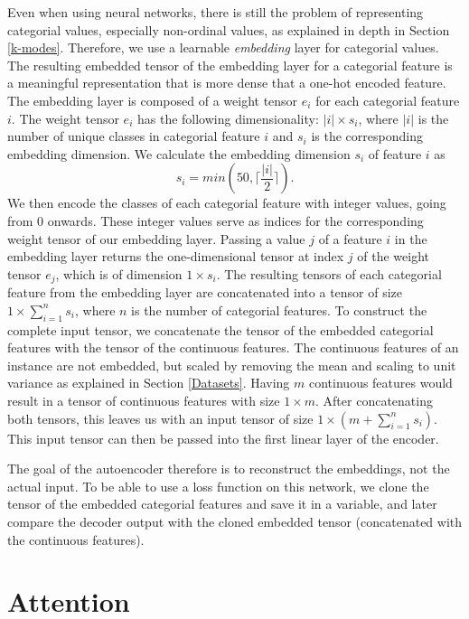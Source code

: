 Even when using neural networks, there is still the problem of representing categorial values, especially non-ordinal values, as explained in depth in Section \ref{k-modes}. Therefore, we use a learnable \textit{embedding} layer for categorial values. The resulting embedded tensor of the embedding layer for a categorial feature is a meaningful representation that is more dense that a one-hot encoded feature. The embedding layer is composed of a weight tensor $e_i$ for each categorial feature $i$. The weight tensor $e_i$  has the following dimensionality: $|i| \times s_i$, where $|i|$ is the number of unique classes in categorial feature $i$ and $s_i$ is the corresponding embedding dimension. We calculate the embedding dimension $s_i$ of feature $i$ as
$$s_i = min(50, \lceil \frac{|i|}{2} \rceil).$$
We then encode the classes of each categorial feature with integer values, going from 0 onwards. These integer values serve as indices for the corresponding weight tensor of our embedding layer. Passing a value $j$ of a feature $i$ in the embedding layer returns the one-dimensional tensor at index $j$ of the weight tensor $e_j$, which is of dimension $1 \times s_i$. The resulting tensors of each categorial feature from the embedding layer are concatenated into a tensor of size $1 \times \sum^n_{i=1}s_i$, where $n$ is the number of categorial features. To construct the complete input tensor, we concatenate the tensor of the embedded categorial features with the tensor of the continuous features. The continuous features of an instance are not embedded, but scaled by removing the mean and scaling to unit variance as explained in Section \ref{Datasets}. Having $m$ continuous features would result in a tensor of continuous features with size $1 \times m$. After concatenating both tensors, this leaves us with an input tensor of size $1 \times (m + \sum^n_{i=1}s_i)$. This input tensor can then be passed into the first linear layer of the encoder.

The goal of the autoencoder therefore is to reconstruct the embeddings, not the actual input. To be able to use a loss function on this network, we clone the tensor of the embedded categorial features and save it in a variable, and later compare the decoder output with the cloned embedded tensor (concatenated with the continuous features).

\section{Attention}

